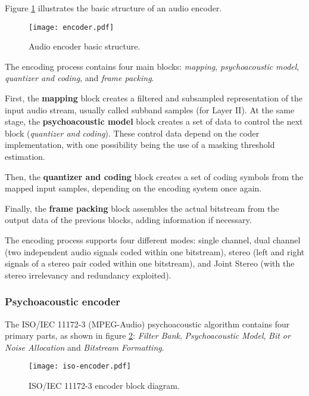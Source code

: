 Figure \ref{fig:encoder} illustrates the basic structure of an audio encoder. 

\begin{figure}[H]
\centerline{\texttt{[image: encoder.pdf]}}
\caption{Audio encoder basic structure.}
\label{fig:encoder}
\end{figure}

The encoding process contains four main blocks: \textit{mapping}, \textit{psychoacoustic model}, \textit{quantizer and coding}, and \textit{frame packing}.

First, the \textbf{mapping} block creates a filtered and subsampled representation of the input audio stream, usually called subband samples (for Layer II). At the same stage, the \textbf{psychoacoustic model} block creates a set of data to control the next block (\textit{quantizer and coding}). These control data depend on the coder implementation, with one possibility being the use of a masking threshold estimation.

Then, the \textbf{quantizer and coding} block creates a set of coding symbols from the mapped input samples, depending on the encoding system once again. 

Finally, the \textbf{frame packing} block assembles the actual bitstream from the output data of the previous blocks, adding information if necessary.

The encoding process supports four different modes: single channel, dual channel (two independent audio signals coded within one bitstream), stereo (left and right signals of a stereo pair coded within one bitstream), and Joint Stereo (with the stereo irrelevancy and redundancy exploited).

\subsubsection{Psychoacoustic encoder}

The ISO/IEC 11172-3 (MPEG-Audio) psychoacoustic algorithm contains four primary parts, as shown in figure \ref{fig:algorithm}: \textit{Filter Bank}, \textit{Psychoacoustic Model}, \textit{Bit or Noise Allocation} and \textit{Bitstream Formatting}.

\begin{figure}[H]
\centerline{\texttt{[image: iso-encoder.pdf]}}
\caption{ISO/IEC 11172-3 encoder block diagram.}
\label{fig:algorithm}
\end{figure}


